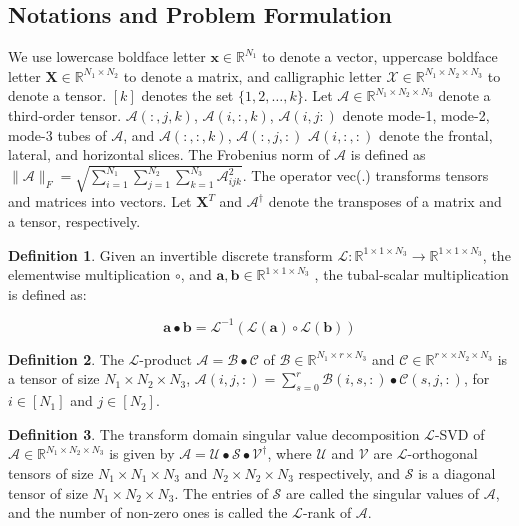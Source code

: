 \documentclass[journal,article,submit,moreauthors,pdftex,10pt,a4paper]{Definitions/mdpi}
\theoremstyle{plain}
\theoremstyle{definition}
\newtheorem{defn}{Definition}[section]
\theoremstyle{remark}
\begin{document}
\subsection{Notations and Problem Formulation}
We use lowercase boldface letter $\mathbf{x} \in \mathbb{R}^{N_1}$ to denote a vector, uppercase boldface letter $\mathbf{X} \in \mathbb{R}^{N_1 \times N_2}$ to denote a matrix, 
and calligraphic letter $\mathcal{X} \in \mathbb{R}^{N_1 \times N_2 \times N_3}$ to denote a tensor. $[k]$ denotes the set $\{1,2,\dots, k\}$. Let $\mathcal{A} \in \mathbb{R}^{N_1 \times N_2 \times N_3}$ 
denote a third-order tensor. $\mathcal{A}(:,j,k)$, $\mathcal{A}(i,:,k)$, $\mathcal{A}(i,j:)$ denote mode-1, mode-2, mode-3 tubes of $\mathcal{A}$, and $\mathcal{A}(:,:,k)$, $\mathcal{A}(:,j,:)$ $\mathcal{A}(i,:,:)$ 
denote the frontal, lateral, and horizontal slices. The Frobenius norm of $\mathcal{A}$ is defined as $\|\mathcal{A}\|_F = \sqrt{\sum ^{N_1}_{i = 1} \sum ^{N_2}_{j = 1} \sum ^{N_3}_{k = 1} \mathcal{A}^2_{ijk}}$.
The operator vec(.) transforms tensors and matrices into vectors. Let $\mathbf{X}^{T}$ and $\mathcal{A}^{\dagger}$ denote the transposes of a matrix and a tensor, respectively.
\begin{defn}
    Given an invertible discrete transform $\mathcal{L}:\mathbb{R}^{1\times 1 \times N_3} \to \mathbb{R}^{1\times 1\times N_3}$, the elementwise multiplication $\circ$, and $\mathbf{a}, \mathbf{b} \in \mathbb{R}^{1\times 1\times N_3}$ , the tubal-scalar multiplication is defined as:
    \begin{center}
        \begin{equation}
            \mathbf{a} \bullet \mathbf{b} = \mathcal{L}^{-1}(\mathcal{L}(\mathbf{a})\circ \mathcal{L}(\mathbf{b}))
        \end{equation}
    \end{center}
\end{defn}

\begin{defn}
    The $\mathcal{L}$-product $\mathcal{A} = \mathcal{B} \bullet \mathcal{C}$ of $\mathcal{B} \in \mathbb{R}^{N_1 \times r \times N_3}$ and $\mathcal{C} \in \mathbb{R}^{r\times \times N_2 \times N_3}$ is a tensor of size $N_1 \times N_2 \times N_3$, $\mathcal{A}(i,j,:) = \sum^r_{s=0}\mathcal{B}(i,s,:)\bullet \mathcal{C}(s,j,:)$, for $i \in [N_1]$ and $j \in [N_2]$.
\end{defn}

\begin{defn}
    The transform domain singular value decomposition $\mathcal{L}$-SVD of $\mathcal{A} \in \mathbb{R}^{N_1 \times N_2 \times N_3}$ is given by $\mathcal{A} = \mathcal{U} \bullet \mathcal{S} \bullet \mathcal{V}^{\dagger}$, where $\mathcal{U}$ and $\mathcal{V}$ are $\mathcal{L}$-orthogonal tensors of size $N_1 \times N_1 \times N_3$ and $N_2 \times N_2 \times N_3$ respectively, and $\mathcal{S}$ is a diagonal tensor of size $N_1 \times N_2 \times N_3$. The entries of $\mathcal{S}$ are called the singular values of $\mathcal{A}$, and the number of non-zero ones is called the $\mathcal{L}$-rank of $\mathcal{A}$.
\end{defn}
\end{document}
